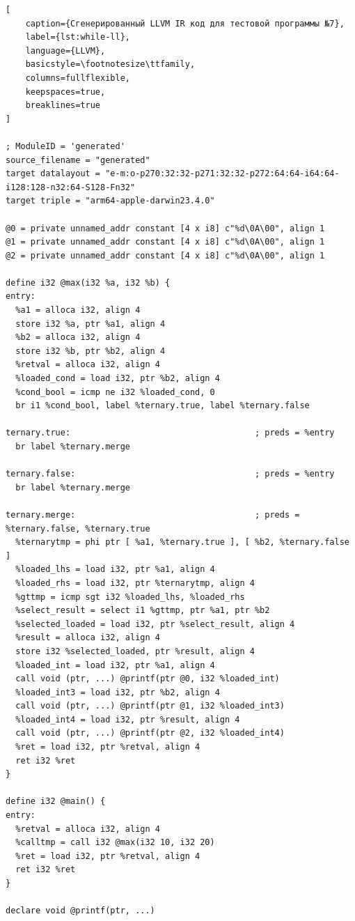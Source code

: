 \begin{lstlisting}[
    caption={Сгенерированный LLVM IR код для тестовой программы №7},
    label={lst:while-ll},
    language={LLVM},
    basicstyle=\footnotesize\ttfamily,
    columns=fullflexible,
    keepspaces=true,
    breaklines=true
]

; ModuleID = 'generated'
source_filename = "generated"
target datalayout = "e-m:o-p270:32:32-p271:32:32-p272:64:64-i64:64-i128:128-n32:64-S128-Fn32"
target triple = "arm64-apple-darwin23.4.0"

@0 = private unnamed_addr constant [4 x i8] c"%d\0A\00", align 1
@1 = private unnamed_addr constant [4 x i8] c"%d\0A\00", align 1
@2 = private unnamed_addr constant [4 x i8] c"%d\0A\00", align 1

define i32 @max(i32 %a, i32 %b) {
entry:
  %a1 = alloca i32, align 4
  store i32 %a, ptr %a1, align 4
  %b2 = alloca i32, align 4
  store i32 %b, ptr %b2, align 4
  %retval = alloca i32, align 4
  %loaded_cond = load i32, ptr %b2, align 4
  %cond_bool = icmp ne i32 %loaded_cond, 0
  br i1 %cond_bool, label %ternary.true, label %ternary.false

ternary.true:                                     ; preds = %entry
  br label %ternary.merge

ternary.false:                                    ; preds = %entry
  br label %ternary.merge

ternary.merge:                                    ; preds = %ternary.false, %ternary.true
  %ternarytmp = phi ptr [ %a1, %ternary.true ], [ %b2, %ternary.false ]
  %loaded_lhs = load i32, ptr %a1, align 4
  %loaded_rhs = load i32, ptr %ternarytmp, align 4
  %gttmp = icmp sgt i32 %loaded_lhs, %loaded_rhs
  %select_result = select i1 %gttmp, ptr %a1, ptr %b2
  %selected_loaded = load i32, ptr %select_result, align 4
  %result = alloca i32, align 4
  store i32 %selected_loaded, ptr %result, align 4
  %loaded_int = load i32, ptr %a1, align 4
  call void (ptr, ...) @printf(ptr @0, i32 %loaded_int)
  %loaded_int3 = load i32, ptr %b2, align 4
  call void (ptr, ...) @printf(ptr @1, i32 %loaded_int3)
  %loaded_int4 = load i32, ptr %result, align 4
  call void (ptr, ...) @printf(ptr @2, i32 %loaded_int4)
  %ret = load i32, ptr %retval, align 4
  ret i32 %ret
}

define i32 @main() {
entry:
  %retval = alloca i32, align 4
  %calltmp = call i32 @max(i32 10, i32 20)
  %ret = load i32, ptr %retval, align 4
  ret i32 %ret
}

declare void @printf(ptr, ...)


\end{lstlisting}



